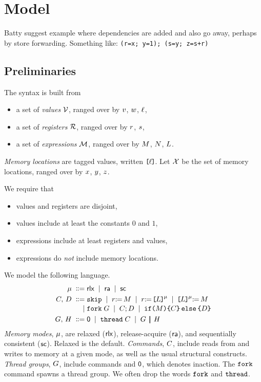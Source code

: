 \section{Model}

Batty suggest example where dependencies are added and also go away, perhaps
by store forwarding. Something like:
\texttt{(r=x; y=1); (s=y; z=s+r)}

\subsection{Preliminaries}
The syntax is built from
\begin{itemize}
\item a set of \emph{values} $\mathcal{V}$, ranged over by
  $v$, $w$, $\ell$,
\item a set of \emph{registers} $\mathcal{R}$, ranged over by
  $r$, $s$,
\item a set of \emph{expressions} $\mathcal{M}$, ranged over by
  $M$, $N$,  $L$.
\end{itemize}
\emph{Memory locations} are tagged values, written $\mkern-1mu\texttt{[}\mkern-1mu\ell \mkern-1mu\texttt{]}\mkern-1mu$.  Let $\mathcal{X}$
be the set of memory locations, ranged over by $x$, $y$, $z$.

We require that
\begin{itemize}
\item values and registers are disjoint,
\item values include at least the constants $0$ and $1$,
\item expressions include at least registers and values, 
\item expressions do \emph{not} include memory locations.
\end{itemize}
We model the following language.
\begin{align*}
  \amode \BNFDEF& \mRLX
  \BNFSEP \mRA 
  \BNFSEP \mSC
  \\
  \aCmd,\,\bCmd
  \BNFDEF& \SKIP
  \BNFSEP \LET{\aReg}{\aExp}
  \BNFSEP \PRREF[\amode]{\cExp}{\aReg}
  \BNFSEP \PWREF[\amode]{\cExp}{\aExp}
  \\[-.5ex]
  \BNFSEP& \FORK{\aGrp}
  \BNFSEP \aCmd \SEMI \bCmd
  \BNFSEP \IF{\aExp} \THEN \aCmd \ELSE \bCmd \FI
  \\
  \aGrp ,\,\bGrp
  \BNFDEF& \NIL
  \BNFSEP\THREAD{\aCmd}
  \BNFSEP\aGrp \PAR \bGrp
\end{align*}
\emph{Memory modes}, $\mu$, are {relaxed} (${\mathsf{rlx}}$), {release-acquire}
(${\mathsf{ra}}$), and {sequentially consistent} (${\mathsf{sc}}$).  Relaxed is the default.
%
\emph{Commands}, $C$, include reads from and writes to memory at a given
mode, as well as the usual structural constructs.
%
\emph{Thread groups}, $G$, include commands and $\mathsf{0}$, which denotes
inaction. %
%
The $\FORK{}$ command spawns a thread group.  We often drop the words
$\FORK{}$ and $\THREAD{}$.

